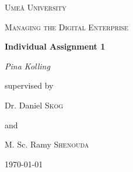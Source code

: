 \documentclass[a4]{scrartcl}
\begin{document}
	
	\begin{titlepage}
		\centering
		{\scshape\LARGE Umeå University \par}
		\vspace{1cm}
		{\scshape\Large Managing the Digital Enterprise \par }
		\vspace{1.5cm}
		{\huge\bfseries  Individual Assignment 1 \par}
		\vspace{2cm}
		{\Large\itshape Pina Kolling\par}
		\vfill
		supervised by \par 
		\vspace{1cm}
		Dr. Daniel \textsc{Skog} \par 
		and \par 
		M. Sc. Ramy \textsc{Shenouda} 
		
		\vfill
		
		{\large \today\par}
	\end{titlepage}
	
	\setcounter{page}{1}
	
	\tableofcontents
	
	\newpage
	
	
	
\end{document}
